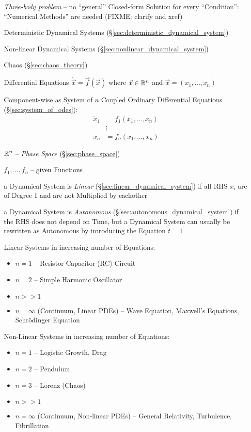 \emph{Three-body problem} -- no ``general'' Closed-form Solution for every
``Condition'': ``Numerical Methods'' are needed
(FIXME: clarify and xref)

Deterministic Dynamical Systems (\S\ref{sec:deterministic_dynamical_system})

Non-linear Dynamical Systems (\S\ref{sec:nonlinear_dynamical_system})

Chaos (\S\ref{sec:chaos_theory})

Differential Equations $\dot{\vec{x}} = \vec{f}(\vec{x})$ where
$\vec{x} \in \mathbb{R}^n$ and $\vec{x} = (x_1,\ldots,x_n)$

Component-wise as System of $n$ Coupled Ordinary Differential Equations
(\S\ref{sec:system_of_odes}):
\begin{align*}
  \dot{x}_1 & = f_1(x_1,\ldots,x_n) \\
            & \vdots \\
  \dot{x}_n & = f_n(x_1,\ldots,x_n)
\end{align*}

$\mathbb{R}^n$ -- \emph{Phase Space} (\S\ref{sec:phase_space})

$f_1, \ldots, f_n$ -- given Functions

a Dynamical System is \emph{Linear} (\S\ref{sec:linear_dynamical_system}) if
all RHS $x_i$ are of Degree $1$ and are not Multiplied by eachother

a Dynamical System is \emph{Autonomous}
(\S\ref{sec:autonomous_dynamical_system}) if the RHS does not depend on Time,
but a Dynamical System can usually be rewritten as Autonomous by introducing
the Equation $\dot{t} = 1$

Linear Systems in increasing number of Equations:
\begin{itemize}
  \item $n = 1$ -- Resistor-Capacitor (RC) Circuit
  \item $n = 2$ -- Simple Harmonic Oscillator
  \item $n >> 1$
  \item $n = \infty$ (Continuum, Linear PDEs) -- Wave Equation, Maxwell's
    Equations, Schr\"odinger Equation
\end{itemize}

Non-Linear Systems in increasing number of Equations:
\begin{itemize}
  \item $n = 1$ -- Logistic Growth, Drag
  \item $n = 2$ -- Pendulum
  \item $n = 3$ -- Lorenz (Chaos)
  \item $n >> 1$
  \item $n = \infty$ (Continuum, Non-linear PDEs) -- General Relativity,
    Turbulence, Fibrillation
\end{itemize}

